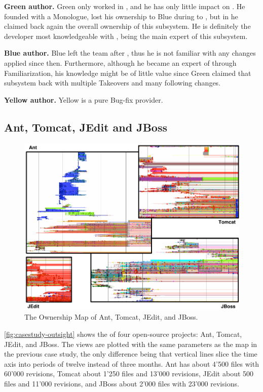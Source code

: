 \textbf{Green author.} Green only worked in , and he has only little impact on . He founded  with a Monologue, lost his ownership to Blue during  to , but in  he claimed back again the overall ownership of this subsystem. He is definitely the developer most knowledgeable with , being the main expert of this subsystem.

\textbf{Blue author.} Blue left the team after , thus he is not familiar with any changes applied since then. Furthermore, although he became an expert of  through Familiarization, his knowledge might be of little value since Green claimed that subsystem back with multiple Takeovers and many following changes.

\textbf{Yellow author.} Yellow is a pure Bug-fix provider.

\subsection{Ant, Tomcat, JEdit and JBoss}

\begin{figure}[htb]
\begin{center}
\includegraphics[width=12.5cm]{fig/casestudies-overview.pdf}
\caption{The Ownership Map of Ant, Tomcat, JEdit, and JBoss.}
\label{fig:casestudies-owerview}
\end{center}
\end{figure}

\autoref{fig:casestudy-outsight} shows the \omap of four open-source projects: Ant, Tomcat, JEdit, and JBoss. The views are plotted with the same parameters as the map in the previous case study, the only difference being that vertical lines slice the time axis into periods of twelve instead of three months. Ant has about 4'500 files with 60'000 revisions, Tomcat about 1'250 files and 13'000 revisions, JEdit about 500 files and 11'000 revisions, and JBoss about 2'000 files with 23'000 revisions.

